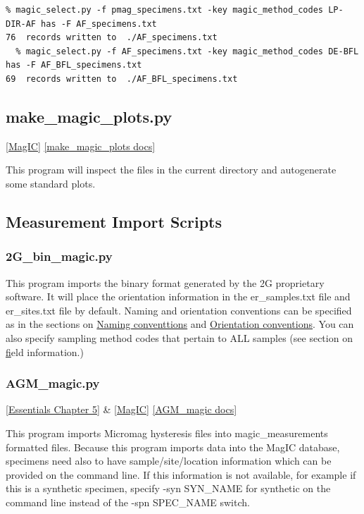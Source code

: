 \documentclass[11pt]{book}
\begin{document}
{{{  \begin{verbatim}
% magic_select.py -f pmag_specimens.txt -key magic_method_codes LP-DIR-AF has -F AF_specimens.txt
76  records written to  ./AF_specimens.txt
  % magic_select.py -f AF_specimens.txt -key magic_method_codes DE-BFL has -F AF_BFL_specimens.txt
69  records written to  ./AF_BFL_specimens.txt

 \end{verbatim} 

\subsection{make\_magic\_plots.py}
\href{#MagIC}{[MagIC]}
\href{http://earthref.org/PmagPy/pmagpydocs/make_magic_plots-module.html}{[make\_magic\_plots docs]}

This program will inspect the files in the current directory and autogenerate some standard plots.  

\subsection{Measurement Import Scripts}

\subsubsection{2G\_bin\_magic.py}
This program imports the binary format generated by the 2G proprietary software.   It will place the orientation information in the er\_samples.txt file and er\_sites.txt file by default.  Naming and orientation conventions can be specified as in the sections on \href{#naming_schemes}{Naming conventtions} and \href{#orientation_schemes}{Orientation conventions}.  You can also specify sampling method codes that pertain to ALL samples (see section on \href{#field_info} field information.)


\subsubsection {AGM\_magic.py} \href{http://magician.ucsd.edu/Essentials_2/WebBook2ch5.html#ch5}{[Essentials Chapter 5]} \& \href{#MagIC}{[MagIC]}
\href{http://earthref.org/PmagPy/pmagpydocs/AGM_magic-module.html}{[AGM\_magic docs]}


This program imports Micromag  hysteresis files into magic\_measurements formatted files.   
Because this program imports data into the MagIC database, specimens need also to have sample/site/location information which can be provided on the command line. If this information is not available, for example if this is a synthetic specimen,  specify -syn  SYN\_NAME for synthetic on the command line instead of the -spn SPEC\_NAME switch.    

}}}
\end{document}
